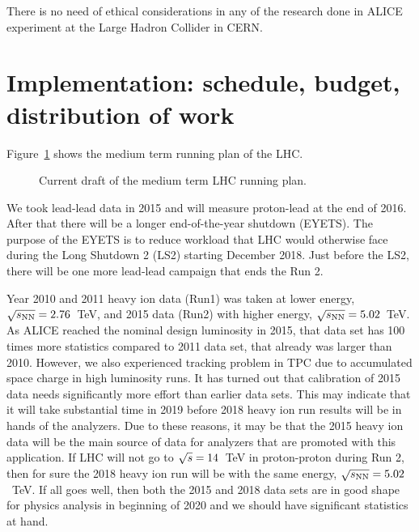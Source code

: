 There is no need of ethical considerations in any of the research done in ALICE experiment at the Large Hadron Collider in CERN.


\section{Implementation: schedule, budget, distribution of work} %
\label{sec:implementation}

Figure~\ref{fig:LHC-mid-term} shows the medium term running plan of the LHC. 
\begin{figure}[htbp]
   \centering
   \caption{Current draft of the medium term LHC running plan.}
   \label{fig:LHC-mid-term}
\end{figure}
We took lead-lead data in 2015 and will measure proton-lead at the end of 2016. After that there will be a longer end-of-the-year shutdown (EYETS). The purpose of the EYETS is to reduce workload that LHC would otherwise face during the Long Shutdown 2 (LS2) starting December 2018. Just before the LS2, there will be one more lead-lead campaign that ends the Run 2.

Year 2010 and 2011 heavy ion data (Run1) was taken at lower energy, $\sqrt{s_{\rm NN}}=2.76$~TeV, and 2015 data (Run2) with higher energy, $\sqrt{s_{\rm NN}}=5.02$~TeV. As ALICE reached the nominal design luminosity in 2015, that data set has 100 times more statistics compared to 2011 data set, that already was larger than 2010. However, we also experienced tracking problem in TPC due to accumulated space charge in high luminosity runs. It has turned out that calibration of 2015 data needs significantly more effort than earlier data sets. This may indicate that it will take substantial time in 2019 before 2018 heavy ion run results will be in hands of the analyzers. Due to these reasons, it may be that the 2015 heavy ion data will be the main source of data for analyzers that are promoted with this application. If LHC will not go to $\sqrt{s}{}=14$~TeV in proton-proton during Run 2, then for sure the 2018 heavy ion run will be with the same energy, $\sqrt{s_{\rm NN}}=5.02$~TeV. If all goes well, then both the 2015 and 2018 data sets are in good shape for physics analysis in beginning of 2020 and we should have significant statistics at hand.

